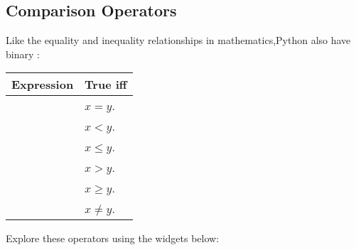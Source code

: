 \documentclass[letterpaper,10pt,english]{sphinxmanual}
\begin{document}
\subsection{Comparison Operators}
\label{\detokenize{Lecture3/Conditional Execution:comparison-operators}}

Like the equality and inequality relationships in mathematics,Python also have binary :


\begin{savenotes}\sphinxattablestart
\centering
\begin{tabulary}{\linewidth}[t]{|T|T|}
\hline
\sphinxstyletheadfamily 
Expression
&\sphinxstyletheadfamily 
True iff
\\
\hline
{}
&
\(x=y\).
\\
\hline
{}
&
\(x<y\).
\\
\hline
{}
&
\(x\leq y\).
\\
\hline
{}
&
\(x>y\).
\\
\hline
{}
&
\(x\geq y\).
\\
\hline
{}
&
\(x\neq y\).
\\
\hline
\end{tabulary}
\par
\sphinxattableend\end{savenotes}

Explore these operators using the widgets below:
\end{document}
